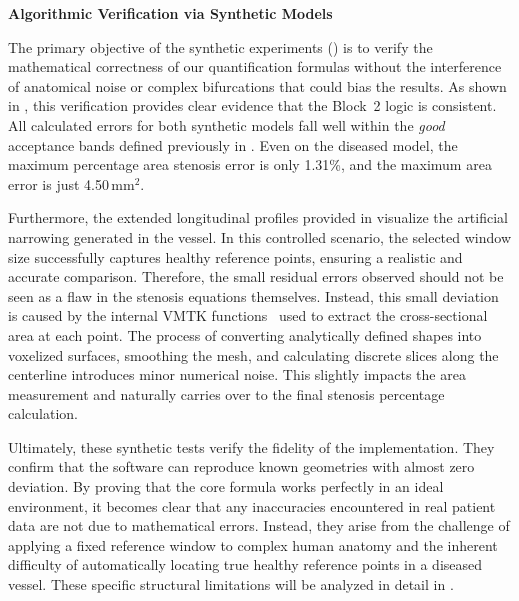 \vspace{0.75em}
\noindent\textbf{Algorithmic Verification via Synthetic Models}\par
\vspace{0.4em}
\noindent
The primary objective of the synthetic experiments () is to verify the mathematical correctness of our quantification formulas without the interference of anatomical noise or complex bifurcations that could bias the results. As shown in , this verification provides clear evidence that the Block~2 logic is consistent. All calculated errors for both synthetic models fall well within the \emph{good} acceptance bands defined previously in . Even on the diseased model, the maximum percentage area stenosis error is only 1.31\%, and the maximum area error is just 4.50\,mm$^2$.

Furthermore, the extended longitudinal profiles provided in  visualize the artificial narrowing generated in the vessel. In this controlled scenario, the selected window size successfully captures healthy reference points, ensuring a realistic and accurate comparison. Therefore, the small residual errors observed should not be seen as a flaw in the stenosis equations themselves. Instead, this small deviation is caused by the internal VMTK functions~\cite{izzo2018} used to extract the cross-sectional area at each point. The process of converting analytically defined shapes into voxelized surfaces, smoothing the mesh, and calculating discrete slices along the centerline introduces minor numerical noise. This slightly impacts the area measurement and naturally carries over to the final stenosis percentage calculation.

Ultimately, these synthetic tests verify the fidelity of the implementation. They confirm that the software can reproduce known geometries with almost zero deviation. By proving that the core formula works perfectly in an ideal environment, it becomes clear that any inaccuracies encountered in real patient data are not due to mathematical errors. Instead, they arise from the challenge of applying a fixed reference window to complex human anatomy and the inherent difficulty of automatically locating true healthy reference points in a diseased vessel. These specific structural limitations will be analyzed in detail in .

